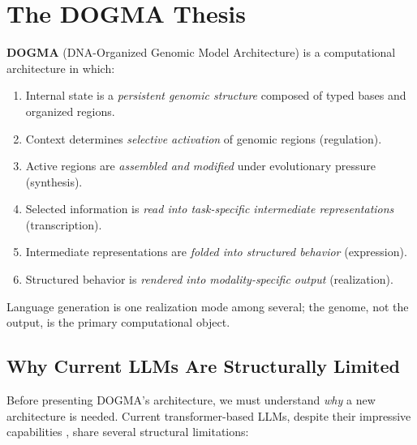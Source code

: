 \section{The DOGMA Thesis}
\label{sec:dogma-thesis}

\begin{dogmadef}
\textbf{DOGMA} (DNA-Organized Genomic Model Architecture) is a computational architecture in which:
\begin{enumerate}[leftmargin=1.5em]
  \item Internal state is a \emph{persistent genomic structure} composed of typed bases and organized regions.
  \item Context determines \emph{selective activation} of genomic regions (regulation).
  \item Active regions are \emph{assembled and modified} under evolutionary pressure (synthesis).
  \item Selected information is \emph{read into task-specific intermediate representations} (transcription).
  \item Intermediate representations are \emph{folded into structured behavior} (expression).
  \item Structured behavior is \emph{rendered into modality-specific output} (realization).
\end{enumerate}
Language generation is one realization mode among several; the genome, not the output, is the primary computational object.
\end{dogmadef}

\subsection{Why Current LLMs Are Structurally Limited}

Before presenting DOGMA's architecture, we must understand \emph{why} a new architecture is needed. Current transformer-based LLMs, despite their impressive capabilities \citep{brown2020, wei2022}, share several structural limitations:

